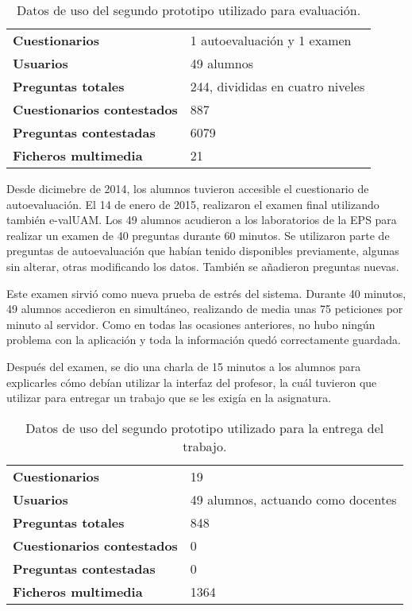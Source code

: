 \begin{table}[hc]
	\centering
	\begin{tabular}{l|l}
		{\bf Cuestionarios}             & 1 autoevaluación y 1 examen \\ 
		{\bf Usuarios}                  & 49 alumnos\\
		{\bf Preguntas totales}         & 244, divididas en cuatro niveles    \\ 
		{\bf Cuestionarios contestados} & 887                              \\ 
		{\bf Preguntas contestadas}     & 6079                             \\ 
		{\bf Ficheros multimedia}		& 21							   \\
	\end{tabular}
	\caption{Datos de uso del segundo prototipo utilizado para evaluaci\'on.}
\end{table}

Desde dicimebre de 2014, los alumnos tuvieron accesible el cuestionario de autoevaluación. El 14 de enero de 2015, realizaron el examen final utilizando también \acrshort{e-valUAM}. Los 49 alumnos acudieron a los laboratorios de la EPS para realizar un examen de 40 preguntas durante 60 minutos. Se utilizaron parte de preguntas de autoevaluación que habían tenido disponibles previamente, algunas sin alterar, otras modificando los datos. También se añadieron preguntas nuevas.

Este examen sirvió como nueva prueba de estrés del sistema. Durante 40 minutos, 49 alumnos accedieron en simultáneo, realizando de media unas 75 peticiones por minuto al servidor. Como en todas las ocasiones anteriores, no hubo ningún problema con la aplicación y toda la información quedó correctamente guardada.

Después del examen, se dio una charla de 15 minutos a los alumnos para explicarles cómo debían utilizar la interfaz del profesor, la cuál tuvieron que utilizar para entregar un trabajo que se les exigía en la asignatura.

\begin{table}[hc]
	\centering
	\begin{tabular}{l|l}
		{\bf Cuestionarios}             & 19 \\ 
		{\bf Usuarios}                  & 49 alumnos, actuando como docentes\\
		{\bf Preguntas totales}         & 848  \\ 
		{\bf Cuestionarios contestados} & 0                              \\ 
		{\bf Preguntas contestadas}     & 0                             \\ 
		{\bf Ficheros multimedia}		& 1364							   \\
	\end{tabular}
	\caption{Datos de uso del segundo prototipo utilizado para la entrega del trabajo.}
\end{table}

